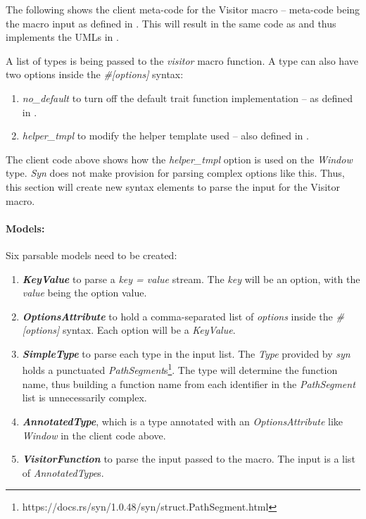 The following shows the client meta-code for the Visitor macro -- meta-code being the macro input as defined in .
This will result in the same code as  and thus implements the UMLs in .


A list of types is being passed to the \textit{visitor} macro function.
A type can also have two options inside the \textit{\#[options]} syntax:
\begin{enumerate}
	\item \textit{no\_default} to turn off the default trait function implementation -- as defined in .
	\item \textit{helper\_tmpl} to modify the helper template used -- also defined in .
\end{enumerate}

The client code above shows how the \textit{helper\_tmpl} option is used on the \textit{Window} type.
\textit{Syn} does not make provision for parsing complex options like this.
Thus, this section will create new syntax elements to parse the input for the Visitor macro.

\paragraph{Models:}
Six parsable models need to be created:
\begin{enumerate}
	\item \textbf{\textit{KeyValue}} to parse a \textit{key = value} stream.
	      The \textit{key} will be an option, with the \textit{value} being the option value.
	\item \textbf{\textit{OptionsAttribute}} to hold a comma-separated list of \textit{options} inside the \textit{\#[options]} syntax.
	      Each option will be a \textit{KeyValue}.
	\item \textbf{\textit{SimpleType}} to parse each type in the input list.
	      The \textit{Type} provided by \textit{syn} holds a punctuated \textit{PathSegment}s\footnote{https://docs.rs/syn/1.0.48/syn/struct.PathSegment.html}.
	      The type will determine the function name, thus building a function name from each identifier in the \textit{PathSegment} list is unnecessarily complex.
	\item \textbf{\textit{AnnotatedType}}, which is a type annotated with an \textit{OptionsAttribute} like \textit{Window} in the client code above.
	\item \textbf{\textit{VisitorFunction}} to parse the input passed to the macro.
	      The input is a list of \textit{AnnotatedType}s.
\end{enumerate}

